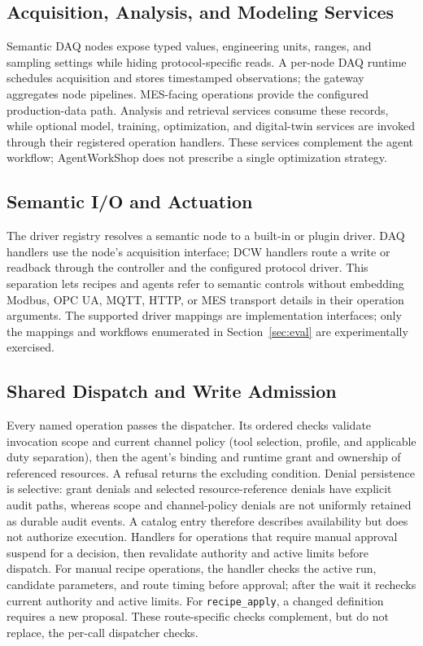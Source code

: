 \subsection{Acquisition, Analysis, and Modeling Services}
Semantic DAQ nodes expose typed values, engineering units, ranges, and
sampling settings while hiding protocol-specific reads. A per-node DAQ
runtime schedules acquisition and stores timestamped observations; the
gateway aggregates node pipelines. MES-facing operations provide the
configured production-data path. Analysis and retrieval services consume
these records, while optional model, training, optimization, and digital-twin
services are invoked through their registered operation handlers. These
services complement the agent workflow; AgentWorkShop does not prescribe a
single optimization strategy.

\subsection{Semantic I/O and Actuation}
The driver registry resolves a semantic node to a built-in or plugin driver.
DAQ handlers use the node's acquisition interface; DCW handlers route a
write or readback through the controller and the configured protocol driver.
This separation lets recipes and agents refer to semantic controls without
embedding Modbus, OPC UA, MQTT, HTTP, or MES transport details in their
operation arguments. The supported driver mappings are implementation
interfaces; only the mappings and workflows enumerated in Section~\ref{sec:eval}
are experimentally exercised.

\subsection{Shared Dispatch and Write Admission}
\label{sec:governed}
Every named operation passes the dispatcher. Its ordered checks validate
invocation scope and current channel policy (tool selection, profile, and
applicable duty separation), then the agent's binding and runtime grant and
ownership of referenced resources.
A refusal returns the excluding condition. Denial persistence is selective:
grant denials and selected resource-reference denials have explicit audit
paths, whereas scope and channel-policy denials are not uniformly retained as
durable audit events. A catalog entry therefore describes availability but
does not authorize execution. Handlers for operations that require manual
approval suspend for a decision, then revalidate authority and active limits
before dispatch. For manual recipe operations, the handler checks the active
run, candidate parameters, and route timing before approval; after the wait it
rechecks current authority and active limits. For \texttt{recipe\_apply}, a
changed definition requires a new proposal. These route-specific checks
complement, but do not replace, the per-call dispatcher checks.

